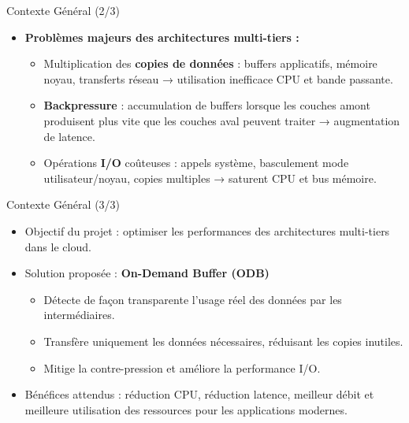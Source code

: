 \documentclass[aspectratio=43,8pt]{beamer}
\begin{document}
\begin{frame}{Contexte Général (2/3)}
    \begin{card}
        \begin{itemize}
            \item \textbf{Problèmes majeurs des architectures multi-tiers :}
            \begin{itemize}
                \item Multiplication des \textbf{copies de données} : buffers applicatifs, mémoire noyau, transferts réseau → utilisation inefficace CPU et bande passante.
                \item \textbf{Backpressure} : accumulation de buffers lorsque les couches amont produisent plus vite que les couches aval peuvent traiter → augmentation de latence.
                \item Opérations \textbf{I/O} coûteuses : appels système, basculement mode utilisateur/noyau, copies multiples → saturent CPU et bus mémoire.
            \end{itemize}
        \end{itemize}
    \end{card}
\end{frame}

\begin{frame}{Contexte Général (3/3)}
    \begin{card}
        \begin{itemize}
            \item Objectif du projet : optimiser les performances des architectures multi-tiers dans le cloud.
            \item Solution proposée : \textbf{On-Demand Buffer (ODB)}
            \begin{itemize}
                \item Détecte de façon transparente l’usage réel des données par les intermédiaires.
                \item Transfère uniquement les données nécessaires, réduisant les copies inutiles.
                \item Mitige la contre-pression et améliore la performance I/O.
            \end{itemize}
            \item Bénéfices attendus : réduction CPU, réduction latence, meilleur débit et meilleure utilisation des ressources pour les applications modernes.
        \end{itemize}
    \end{card}
\end{frame}
\end{document}
